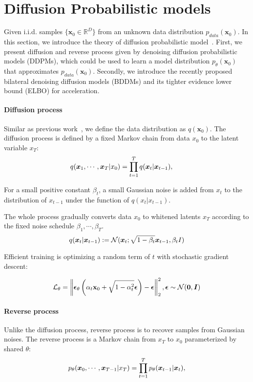 
\section{Diffusion Probabilistic models} \label{appendix:diffusion}
Given i.i.d. samples $\{\mathbf{x}_{0} \in \mathbb{R}^{D}\}$ from an unknown data distribution $p_{data}(\mathbf{x}_{0})$. In this section, we introduce the theory of diffusion probabilistic model~\cite{ho2020denoising,lam2022bddm,song2020denoising,song2020score}. First, we present diffusion and reverse process given by denoising diffusion probabilistic models (DDPMs), which could be used to learn a model distribution $p_{\theta}(\mathbf{x}_{0})$ that approximates $p_{data}(\mathbf{x}_{0})$. Secondly, we introduce the recently proposed bilateral denoising diffusion models (BDDMs) and its tighter evidence lower bound (ELBO) for acceleration. 

\paragraph{Diffusion process}  Similar as previous work~\cite{ho2020denoising,lam2022bddm,song2020denoising}, we define the data distribution as $q(\mathbf{x}_{0})$. The diffusion process is defined by a fixed Markov chain from data $x_0$ to the latent variable $x_T$:
\begin{align}
q(\vx_{1},\cdots,\vx_T|x_0) = \prod_{t=1}^T q(\vx_t|\vx_{t-1}),
\quad\ \ 
\end{align}

For a small positive constant $\beta_t$, a small Gaussian noise is added from $x_{t}$ to the distribution of $x_{t-1}$ under the function of $q(x_t|x_{t-1})$.

The whole process gradually converts data $x_0$ to whitened latents $x_T$ according to the fixed noise schedule $\beta_1,\cdots,\beta_T$.
\begin{align}
q({\bm{x}}_t|{\bm{x}}_{t-1}) := {\mathcal{N}}({\bm{x}}_t;\sqrt{1-\beta_t}{\bm{x}}_{t-1},\beta_t I)
\end{align}

Efficient training is optimizing a random term of $t$ with stochastic gradient descent: 

\begin{align}
    \label{eq: score_loss}
    {\mathcal{L}}_{\theta} = \left\lVert \boldsymbol\epsilon_\theta\left(\alpha_t{\mathbf{x}}_{0}+\sqrt{1-\alpha_t^2}\boldsymbol\epsilon\right)-\boldsymbol\epsilon\right\rVert_2^2, \boldsymbol\epsilon\sim{\mathcal{N}}({\bm{0}}, {\bm{I}})
\end{align}


\paragraph{Reverse process}  Unlike the diffusion process, reverse process is to recover samples from Gaussian noises. The reverse process is a Markov chain from $x_T$ to $x_0$ parameterized by shared $\theta$:
\begin{align}
p_{\theta}({\bm{x}}_0,\cdots,{\bm{x}}_{T-1}|x_T)=\prod_{t=1}^T p_{\theta}({\bm{x}}_{t-1}|{\bm{x}}_t),
\end{align}

